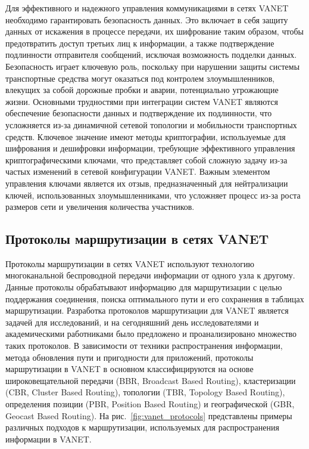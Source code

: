 Для эффективного и надежного управления коммуникациями в сетях VANET необходимо гарантировать безопасность данных. Это включает в себя защиту данных от искажения в процессе передачи, их шифрование таким образом, чтобы предотвратить доступ третьих лиц к информации, а также подтверждение подлинности отправителя сообщений, исключая возможность подделки данных. Безопасность играет ключевую роль, поскольку при нарушении защиты системы транспортные средства могут оказаться под контролем злоумышленников, влекущих за собой дорожные пробки и аварии, потенциально угрожающие жизни. Основными трудностями при интеграции систем VANET являются обеспечение безопасности данных и подтверждение их подлинности, что усложняется из-за динамичной сетевой топологии и мобильности транспортных средств. Ключевое значение имеют методы криптографии, используемые для шифрования и дешифровки информации, требующие эффективного управления криптографическими ключами, что представляет собой сложную задачу из-за частых изменений в сетевой конфигурации VANET. Важным элементом управления ключами является их отзыв, предназначенный для нейтрализации ключей, использованных злоумышленниками, что усложняет процесс из-за роста размеров сети и увеличения количества участников.


\subsection{Протоколы маршрутизации в сетях VANET}

Протоколы маршрутизации в сетях VANET используют технологию многоканальной беспроводной передачи информации от одного узла к другому. Данные протоколы обрабатывают информацию для маршрутизации с целью поддержания соединения, поиска оптимального пути и его сохранения в таблицах маршрутизации. Разработка протоколов маршрутизации для VANET является задачей для исследований, и на сегодняшний день исследователями и академическими работниками было предложено и проанализировано множество таких протоколов. В зависимости от техники распространения информации, метода обновления пути и пригодности для приложений, протоколы маршрутизации в VANET в основном классифицируются на основе широковещательной передачи (BBR, Broadcast Based Routing), кластеризации (CBR, Cluster Based Routing), топологии (TBR, Topology Based Routing), определения позиции (PBR, Position Based Routing) и географической (GBR, Geocast Based Routing). На рис.~\ref{fig:vanet_protocols} представлены примеры различных подходов к маршрутизации, используемых для распространения информации в VANET.

